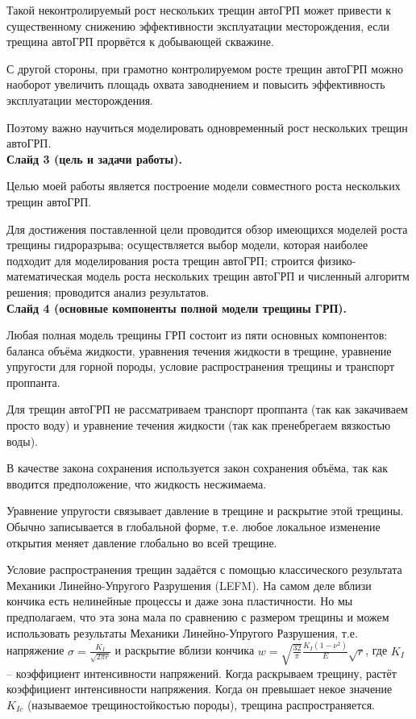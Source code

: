 \documentclass[a4paper, 12pt]{article}
\begin{document}
Такой неконтролируемый рост нескольких трещин автоГРП может привести к существенному снижению эффективности эксплуатации месторождения, если трещина автоГРП прорвётся к добывающей скважине.

С другой стороны, при грамотно контролируемом росте трещин автоГРП можно наоборот увеличить площадь охвата заводнением и повысить эффективность эксплуатации месторождения.

Поэтому важно научиться моделировать одновременный рост нескольких трещин автоГРП.\\ 

\textbf{Слайд 3 (цель и задачи работы).}

Целью моей работы является построение модели совместного роста нескольких трещин автоГРП.

Для достижения поставленной цели проводится обзор имеющихся моделей роста трещины гидроразрыва;
осуществляется выбор модели, которая наиболее подходит для моделирования роста трещин автоГРП;
строится физико-математическая модель роста нескольких трещин автоГРП и численный алгоритм решения;
проводится анализ результатов.\\

\textbf{Слайд 4 (основные компоненты полной модели трещины ГРП).}

Любая полная модель трещины ГРП состоит из пяти основных компонентов: баланса объёма жидкости, уравнения течения жидкости в трещине, уравнение упругости для горной породы, условие распространения трещины и транспорт проппанта.

Для трещин автоГРП не рассматриваем транспорт проппанта (так как закачиваем просто воду) и уравнение течения жидкости (так как пренебрегаем вязкостью воды).

В качестве закона сохранения используется закон сохранения объёма, так как вводится предположение, что жидкость несжимаема.

Уравнение упругости связывает давление в трещине и раскрытие этой трещины.
Обычно записывается в глобальной форме, т.е. любое локальное изменение открытия меняет давление глобально во всей трещине.

Условие распространения трещин задаётся с помощью классического результата Механики Линейно-Упругого Разрушения (LEFM).
На самом деле вблизи кончика есть нелинейные процессы и даже зона пластичности.
Но мы предполагаем, что эта зона мала по сравнению с размером трещины и можем использовать результаты Механики Линейно-Упругого Разрушения, т.е. напряжение $\sigma=\frac{K_I}{\sqrt{2\pi r}}$ и раскрытие вблизи кончика $w=\sqrt{\frac{32}{\pi}}\frac{K_{I}\left(1-\nu^2\right)}{E}\sqrt{r}$, где $K_I$ -- коэффициент интенсивности напряжений.
Когда раскрываем трещину, растёт коэффициент интенсивности напряжения.
Когда он превышает некое значение $K_{Ic}$ (называемое трещиностойкостью породы), трещина распространяется.\\
\end{document}
